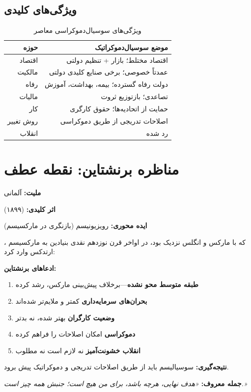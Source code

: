 \subsection{ویژگی‌های کلیدی}

\begin{table}[htbp]
\centering
\caption{ویژگی‌های سوسیال‌دموکراسی معاصر}
\label{tab:socdem-features}
\begin{tabular}{r|r}
\toprule
\textbf{حوزه} & \textbf{موضع سوسیال‌دموکراتیک} \\
\midrule
اقتصاد & اقتصاد مختلط؛ بازار + تنظیم دولتی \\
مالکیت & عمدتاً خصوصی؛ برخی صنایع کلیدی دولتی \\
رفاه & دولت رفاه گسترده؛ بیمه، بهداشت، آموزش \\
مالیات & تصاعدی؛ بازتوزیع ثروت \\
کار & حمایت از اتحادیه‌ها؛ حقوق کارگری \\
روش تغییر & اصلاحات تدریجی از طریق دموکراسی \\
انقلاب & رد شده \\
\bottomrule
\end{tabular}
\end{table}

\section{مناظره برنشتاین: نقطه عطف}

\begin{personbox}

\textbf{ملیت:} آلمانی

\textbf{اثر کلیدی:}  (۱۸۹۹)

\textbf{ایده محوری:} رویزیونیسم (بازنگری در مارکسیسم)

\mediumspace

، که با مارکس و انگلس نزدیک بود، در اواخر قرن نوزدهم نقدی بنیادین به مارکسیسم ارتدکس وارد کرد:

\textbf{ادعاهای برنشتاین:}
\begin{enumerate}[nosep]
    \item \textbf{طبقه متوسط محو نشده}—برخلاف پیش‌بینی مارکس، رشد کرده
    \item \textbf{بحران‌های سرمایه‌داری} کمتر و ملایم‌تر شده‌اند
    \item \textbf{وضعیت کارگران} بهتر شده، نه بدتر
    \item \textbf{دموکراسی} امکان اصلاحات را فراهم کرده
    \item \textbf{انقلاب خشونت‌آمیز} نه لازم است نه مطلوب
\end{enumerate}

\mediumspace

\textbf{نتیجه‌گیری:} سوسیالیسم باید از طریق اصلاحات تدریجی و دموکراتیک پیش برود.

\mediumspace

\textbf{جمله معروف:} \textit{«هدف نهایی، هرچه باشد، برای من هیچ است؛ جنبش همه چیز است.»}
\end{personbox}

